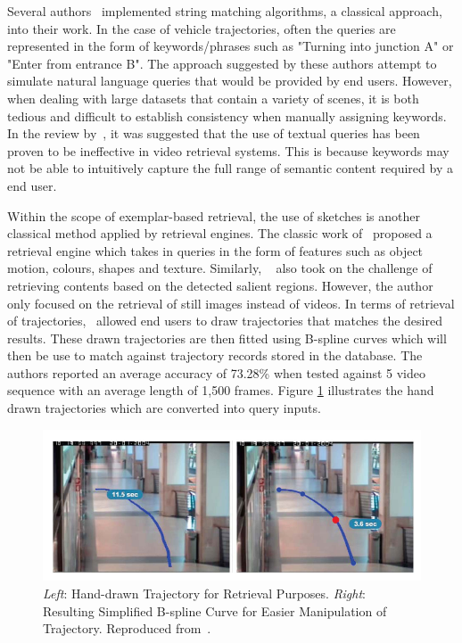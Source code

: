 Several authors~\cite{feris2012large,momin2015vehicle,yang2015semantic} implemented string matching algorithms, a classical approach, into their work. In the case of vehicle trajectories, often the queries are represented in the form of keywords/phrases such as "Turning into junction A" or "Enter from entrance B". The approach suggested by these authors attempt to simulate natural language queries that would be provided by end users. However, when dealing with large datasets that contain a variety of scenes, it is both tedious and difficult to establish consistency when manually assigning keywords. In the review by~, it was suggested that the use of textual
queries has been proven to be ineffective in video retrieval systems. This is
because keywords may not be able to intuitively capture the full range of semantic content
required by a end user.

Within the scope of exemplar-based retrieval, the use of sketches is
another classical method applied by retrieval engines. The classic work of~ proposed a retrieval engine which takes in queries in the form of features such as object motion, colours, shapes and texture. Similarly,
~ also took on the challenge of retrieving contents based
on the detected salient regions. However, the author only focused on the retrieval of still images instead of videos. In terms of retrieval of trajectories,~ allowed end users to draw trajectories that
matches the desired results. These drawn trajectories are then fitted using
B-spline curves which will then be use to match against trajectory records stored in
the database. The authors reported an average accuracy of 73.28\% when tested
against 5 video sequence with an average length of 1,500 frames. Figure
\ref{fig:drawquery1} illustrates the hand drawn trajectories which are converted
into query inputs.


\begin{figure}[hbt!]
  \centering
  \includegraphics[width=.9\textwidth]{image/lit/trajdraw1.PNG}
  \caption[\textit{Left}: Hand-drawn Trajectory for Retrieval Purposes.
  \textit{Right}: Resulting Simplified B-spline Curve for Easier Manipulation of
  Trajectory] {\textit{Left}: Hand-drawn Trajectory for Retrieval Purposes.
  \textit{Right}: Resulting Simplified B-spline Curve for Easier Manipulation of
  Trajectory. Reproduced from~.}
  \label{fig:drawquery1}
\end{figure}


